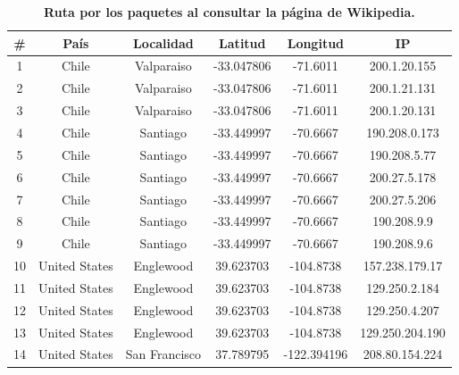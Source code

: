 \documentclass[12pt]{article}
\begin{document}
\begin{table}[H]
\centering
\begin{tabular}{| c | c | c | c | c | c |}
\hline
\# & País & Localidad & Latitud & Longitud & IP\\
\hline
1 & Chile & Valparaiso & -33.047806 & -71.6011 & 200.1.20.155\\
\hline
2 & Chile & Valparaiso & -33.047806 & -71.6011 & 200.1.21.131\\
\hline
3 & Chile & Valparaiso & -33.047806 & -71.6011 & 200.1.20.131\\
\hline
4 & Chile & Santiago & -33.449997 & -70.6667 & 190.208.0.173\\
\hline
5 & Chile & Santiago & -33.449997 & -70.6667 & 190.208.5.77\\
\hline
6 & Chile & Santiago & -33.449997 & -70.6667 & 200.27.5.178\\
\hline
7 & Chile & Santiago & -33.449997 & -70.6667 & 200.27.5.206\\
\hline
8 & Chile & Santiago & -33.449997 & -70.6667 & 190.208.9.9\\
\hline
9 & Chile & Santiago & -33.449997 & -70.6667 & 190.208.9.6\\
\hline
10 & United States & Englewood & 39.623703 & -104.8738 & 157.238.179.17\\
\hline
11 & United States & Englewood & 39.623703 & -104.8738 & 129.250.2.184\\
\hline
12 & United States & Englewood & 39.623703 & -104.8738 & 129.250.4.207\\
\hline
13 & United States & Englewood & 39.623703 & -104.8738 & 129.250.204.190\\
\hline
14 & United States & San Francisco & 37.789795 & -122.394196 & 208.80.154.224\\
\hline
\end{tabular}
\caption{\small \textbf{Ruta por los paquetes al consultar la página de Wikipedia.}}
\end{table}
\end{document}
